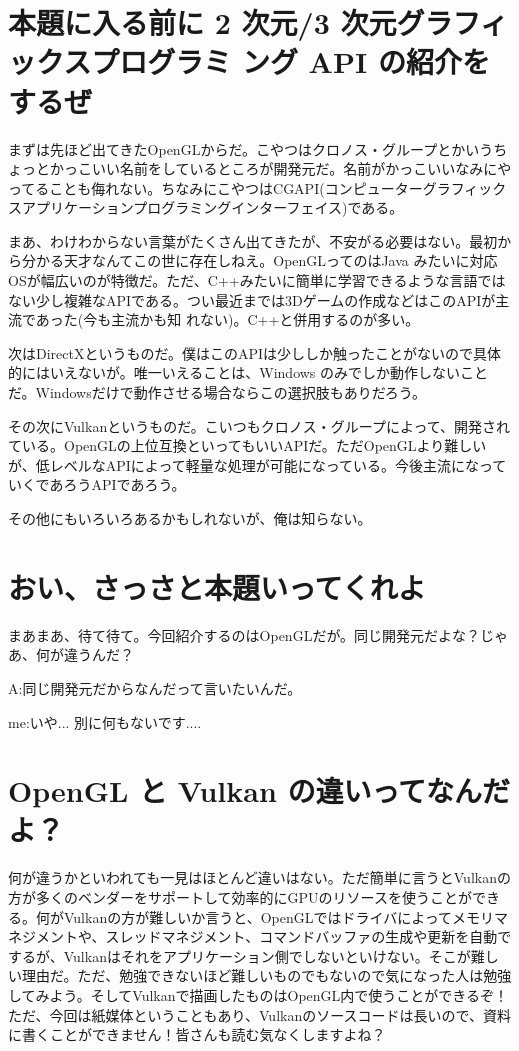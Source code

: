 \documentclass[a4paper,titlepage,dvipdfmx]{jsarticle}
\begin{document}
\section{本題に入る前に 2 次元/3 次元グラフィックスプログラミ ング API の紹介をするぜ}
まずは先ほど出てきたOpenGLからだ。こやつはクロノス・グループとかいうちょっとかっこいい名前をしているところが開発元だ。名前がかっこいいなみにやってることも侮れない。ちなみにこやつはCGAPI(コンピューターグラフィックスアプリケーションプログラミングインターフェイス)である。 

まあ、わけわからない言葉がたくさん出てきたが、不安がる必要はない。最初から分かる天才なんてこの世に存在しねえ。OpenGLってのはJava みたいに対応OSが幅広いのが特徴だ。ただ、C++みたいに簡単に学習できるような言語ではない少し複雑なAPIである。つい最近までは3Dゲームの作成などはこのAPIが主流であった(今も主流かも知 れない)。C++と併用するのが多い。 

次はDirectXというものだ。僕はこのAPIは少ししか触ったことがないので具体的にはいえないが。唯一いえることは、Windows のみでしか動作しないことだ。Windowsだけで動作させる場合ならこの選択肢もありだろう。 

その次にVulkanというものだ。こいつもクロノス・グループによって、開発されている。OpenGLの上位互換といってもいいAPIだ。ただOpenGLより難しいが、低レベルなAPIによって軽量な処理が可能になっている。今後主流になっていくであろうAPIであろう。 

その他にもいろいろあるかもしれないが、俺は知らない。

\section{おい、さっさと本題いってくれよ}
まあまあ、待て待て。今回紹介するのはOpenGLだが。同じ開発元だよな？じゃあ、何が違うんだ？

 A:同じ開発元だからなんだって言いたいんだ。
 
 me:いや... 別に何もないです....
 
\section{OpenGL と Vulkan の違いってなんだよ？}
何が違うかといわれても一見はほとんど違いはない。ただ簡単に言うとVulkanの方が多くのベンダーをサポートして効率的にGPUのリソースを使うことができる。何がVulkanの方が難しいか言うと、OpenGLではドライバによってメモリマネジメントや、スレッドマネジメント、コマンドバッファの生成や更新を自動でするが、Vulkanはそれをアプリケーション側でしないといけない。そこが難しい理由だ。ただ、勉強できないほど難しいものでもないので気になった人は勉強してみよう。そしてVulkanで描画したものはOpenGL内で使うことができるぞ！ただ、今回は紙媒体ということもあり、Vulkanのソースコードは長いので、資料に書くことができません！皆さんも読む気なくしますよね？
\end{document}
